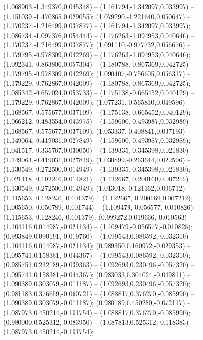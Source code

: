 (1.068903,-1.349370,0.045348) -- (1.161794,-1.342097,0.033997) -- (1.151039,-1.470865,0.029055);
 (1.079290,-1.221640,0.050647) -- (1.170237,-1.216499,0.037877) -- (1.161794,-1.342097,0.033997);
 (1.086734,-1.097376,0.054444) -- (1.176263,-1.094953,0.040646) -- (1.170237,-1.216499,0.037877);
 (1.091110,-0.977732,0.056676) -- (1.179795,-0.978309,0.042269) -- (1.176263,-1.094953,0.040646);
 (1.092341,-0.863806,0.057304) -- (1.180788,-0.867369,0.042725) -- (1.179795,-0.978309,0.042269);
 (1.090407,-0.756605,0.056317) -- (1.179229,-0.762867,0.042009) -- (1.180788,-0.867369,0.042725);
 (1.085342,-0.657024,0.053733) -- (1.175138,-0.665452,0.040129) -- (1.179229,-0.762867,0.042009);
 (1.077231,-0.565810,0.049596) -- (1.168567,-0.575677,0.037109) -- (1.175138,-0.665452,0.040129);
 (1.066212,-0.483554,0.043975) -- (1.159600,-0.493987,0.032989) -- (1.168567,-0.575677,0.037109);
 (1.053337,-0.408841,0.037193) -- (1.149064,-0.419031,0.027849) -- (1.159600,-0.493987,0.032989);
 (1.041517,-0.335767,0.030050) -- (1.139335,-0.345398,0.021830) -- (1.149064,-0.419031,0.027849);
 (1.030899,-0.263644,0.022596) -- (1.130549,-0.272500,0.014949) -- (1.139335,-0.345398,0.021830);
 (1.021418,-0.192246,0.014821) -- (1.122667,-0.200169,0.007212) -- (1.130549,-0.272500,0.014949);
 (1.013018,-0.121362,0.006712) -- (1.115653,-0.128246,-0.001379) -- (1.122667,-0.200169,0.007212);
 (1.005650,-0.050789,-0.001744) -- (1.109479,-0.056577,-0.010826) -- (1.115653,-0.128246,-0.001379);
 (0.999272,0.019666,-0.010563) -- (1.104116,0.014987,-0.021134) -- (1.109479,-0.056577,-0.010826);
 (0.993849,0.090191,-0.019760) -- (1.099543,0.086592,-0.032310) -- (1.104116,0.014987,-0.021134);
 (0.989350,0.160972,-0.029353) -- (1.095741,0.158381,-0.044367) -- (1.099543,0.086592,-0.032310);
 (0.985751,0.232189,-0.039363) -- (1.092693,0.230496,-0.057320) -- (1.095741,0.158381,-0.044367);
 (0.983033,0.304024,-0.049811) -- (1.090389,0.303079,-0.071187) -- (1.092693,0.230496,-0.057320);
 (0.981183,0.376659,-0.060721) -- (1.088817,0.376270,-0.085990) -- (1.090389,0.303079,-0.071187);
 (0.980189,0.450280,-0.072117) -- (1.087973,0.450214,-0.101754) -- (1.088817,0.376270,-0.085990);
 (0.980000,0.525312,-0.083950) -- (1.087813,0.525312,-0.118383) -- (1.087973,0.450214,-0.101754);
